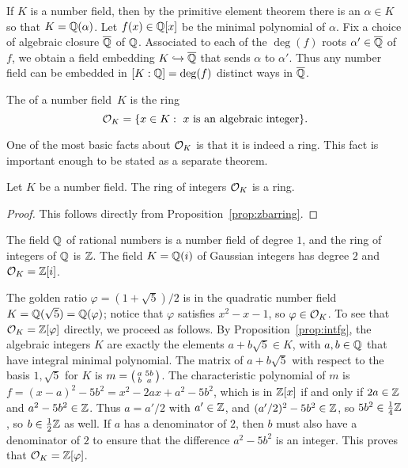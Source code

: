 If $K$ is a number field, then by the primitive element theorem there
is an $\alpha \in K$ so that $K = \mathbb{Q}(\alpha)$.  Let $f(x) \in \mathbb{Q}[x]$
be the minimal polynomial of $\alpha$.  Fix a choice of algebraic
closure $\overline{\mathbb{Q}}$ of $\mathbb{Q}$.  Associated to each of the $\deg(f)$ roots
$\alpha'\in\overline{\mathbb{Q}}$ of $f$, we obtain a field embedding $K\hookrightarrow \overline{\mathbb{Q}}$
that sends $\alpha$ to $\alpha'$.  Thus any number field can be
embedded in $[K:\mathbb{Q}]=\deg(f)$ distinct ways in $\overline{\mathbb{Q}}$.

\begin{definition}
	The  of a number field~$K$ is the ring
	$$
		\mathcal{O}_K = \{x \in K : \text{ $x$ is an algebraic integer}\}.
	$$
\end{definition}

One of the most basic facts about $\mathcal{O}_K$ is that it is indeed a ring.
This fact is important enough to be stated as a separate theorem.

\begin{theorem}
	Let $K$ be a number field.
	The ring of integers $\mathcal{O}_K$ is a ring.
\end{theorem}
\begin{proof}
	This follows directly from Proposition~\ref{prop:zbarring}.
\end{proof}


\begin{example}
	The field $\mathbb{Q}$ of rational numbers is a number field of degree $1$,
	and the ring of integers of $\mathbb{Q}$ is $\mathbb{Z}$.  The field $K=\mathbb{Q}(i)$ of
	Gaussian integers has degree $2$ and $\mathcal{O}_K = \mathbb{Z}[i]$.
\end{example}

\begin{example}\label{example:Qsqrt5ringofints}
	The golden ratio $\varphi =(1+\sqrt{5})/2$ is in the quadratic
	number field $K=\mathbb{Q}(\sqrt{5})=\mathbb{Q}(\varphi)$; notice that
	$\varphi$ satisfies $x^2-x-1$, so $\varphi\in\mathcal{O}_K$.
	To see that $\mathcal{O}_K = \mathbb{Z}[\varphi]$ directly, we proceed as follows.
	By Proposition~\ref{prop:intfg}, the algebraic integers $K$
	are exactly the elements $a+b\sqrt{5} \in K$, with $a,b\in\mathbb{Q}$
	that have integral minimal polynomial. The matrix of $a+b\sqrt{5}$
	with respect to the basis $1,\sqrt{5}$ for $K$ is
	$m=\left( \begin{smallmatrix}a&5b\\b&a\end{smallmatrix}\right)$. The characteristic polynomial of $m$ is
	$f = (x-a)^2 - 5b^2 = x^2 - 2ax + a^2 - 5b^2$, which is in $\mathbb{Z}[x]$
	if and only if $2a\in\mathbb{Z}$ and $a^2-5b^2\in\mathbb{Z}$. Thus $a=a'/2$ with
	$a'\in\mathbb{Z}$, and $(a'/2)^2 - 5b^2 \in\mathbb{Z}$, so $5b^2 \in \frac{1}{4}\mathbb{Z}$,
	so $b\in\frac{1}{2}\mathbb{Z}$ as well. If $a$ has a denominator of $2$,
	then $b$ must also have a denominator of $2$ to ensure that the
	difference $a^2-5b^2$ is an integer. This proves that
	$\mathcal{O}_K = \mathbb{Z}[\varphi]$.
\end{example}

